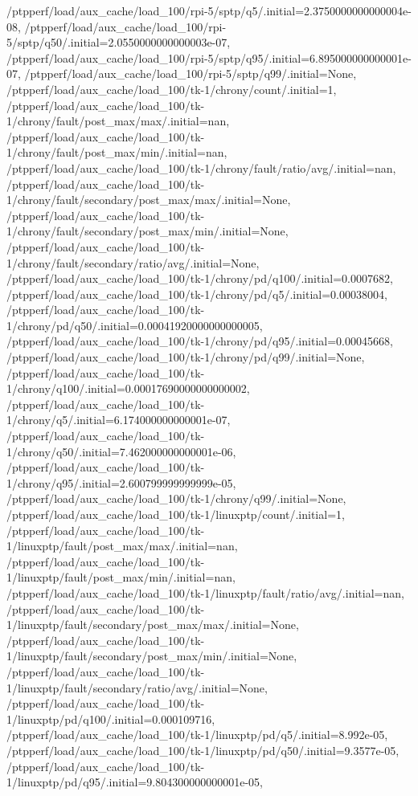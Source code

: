 {    /ptpperf/load/aux_cache/load_100/rpi-5/sptp/q5/.initial=2.3750000000000004e-08,
    /ptpperf/load/aux_cache/load_100/rpi-5/sptp/q50/.initial=2.0550000000000003e-07,
    /ptpperf/load/aux_cache/load_100/rpi-5/sptp/q95/.initial=6.895000000000001e-07,
    /ptpperf/load/aux_cache/load_100/rpi-5/sptp/q99/.initial=None,
    /ptpperf/load/aux_cache/load_100/tk-1/chrony/count/.initial=1,
    /ptpperf/load/aux_cache/load_100/tk-1/chrony/fault/post_max/max/.initial=nan,
    /ptpperf/load/aux_cache/load_100/tk-1/chrony/fault/post_max/min/.initial=nan,
    /ptpperf/load/aux_cache/load_100/tk-1/chrony/fault/ratio/avg/.initial=nan,
    /ptpperf/load/aux_cache/load_100/tk-1/chrony/fault/secondary/post_max/max/.initial=None,
    /ptpperf/load/aux_cache/load_100/tk-1/chrony/fault/secondary/post_max/min/.initial=None,
    /ptpperf/load/aux_cache/load_100/tk-1/chrony/fault/secondary/ratio/avg/.initial=None,
    /ptpperf/load/aux_cache/load_100/tk-1/chrony/pd/q100/.initial=0.0007682,
    /ptpperf/load/aux_cache/load_100/tk-1/chrony/pd/q5/.initial=0.00038004,
    /ptpperf/load/aux_cache/load_100/tk-1/chrony/pd/q50/.initial=0.00041920000000000005,
    /ptpperf/load/aux_cache/load_100/tk-1/chrony/pd/q95/.initial=0.00045668,
    /ptpperf/load/aux_cache/load_100/tk-1/chrony/pd/q99/.initial=None,
    /ptpperf/load/aux_cache/load_100/tk-1/chrony/q100/.initial=0.00017690000000000002,
    /ptpperf/load/aux_cache/load_100/tk-1/chrony/q5/.initial=6.174000000000001e-07,
    /ptpperf/load/aux_cache/load_100/tk-1/chrony/q50/.initial=7.462000000000001e-06,
    /ptpperf/load/aux_cache/load_100/tk-1/chrony/q95/.initial=2.600799999999999e-05,
    /ptpperf/load/aux_cache/load_100/tk-1/chrony/q99/.initial=None,
    /ptpperf/load/aux_cache/load_100/tk-1/linuxptp/count/.initial=1,
    /ptpperf/load/aux_cache/load_100/tk-1/linuxptp/fault/post_max/max/.initial=nan,
    /ptpperf/load/aux_cache/load_100/tk-1/linuxptp/fault/post_max/min/.initial=nan,
    /ptpperf/load/aux_cache/load_100/tk-1/linuxptp/fault/ratio/avg/.initial=nan,
    /ptpperf/load/aux_cache/load_100/tk-1/linuxptp/fault/secondary/post_max/max/.initial=None,
    /ptpperf/load/aux_cache/load_100/tk-1/linuxptp/fault/secondary/post_max/min/.initial=None,
    /ptpperf/load/aux_cache/load_100/tk-1/linuxptp/fault/secondary/ratio/avg/.initial=None,
    /ptpperf/load/aux_cache/load_100/tk-1/linuxptp/pd/q100/.initial=0.000109716,
    /ptpperf/load/aux_cache/load_100/tk-1/linuxptp/pd/q5/.initial=8.992e-05,
    /ptpperf/load/aux_cache/load_100/tk-1/linuxptp/pd/q50/.initial=9.3577e-05,
    /ptpperf/load/aux_cache/load_100/tk-1/linuxptp/pd/q95/.initial=9.804300000000001e-05,
}
